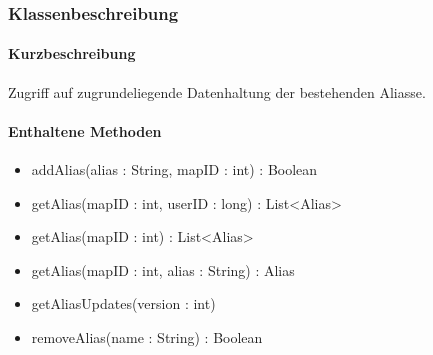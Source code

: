 \subsubsection*{Klassenbeschreibung}%
\paragraph*{Kurzbeschreibung}
Zugriff auf zugrundeliegende Datenhaltung der bestehenden Aliasse.
\paragraph*{Enthaltene Methoden}
\begin{itemize}
    \item addAlias(alias : String, mapID : int) : Boolean
    \item getAlias(mapID : int, userID : long) : List<Alias>
    \item getAlias(mapID : int) : List<Alias>
    \item getAlias(mapID : int, alias : String) : Alias
    \item getAliasUpdates(version : int)
    \item removeAlias(name : String) : Boolean
\end{itemize}
